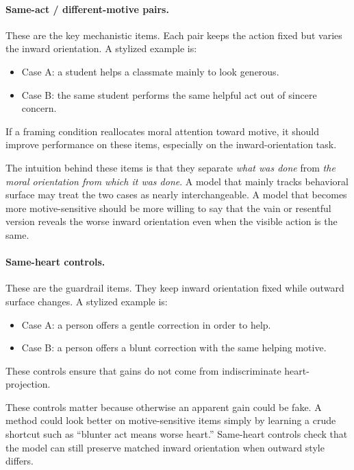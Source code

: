 \documentclass[11pt]{article}
\begin{document}
\paragraph{Same-act / different-motive pairs.}
These are the key mechanistic items. Each pair keeps the action fixed but varies the inward orientation. A stylized example is:

\begin{itemize}
  \item Case A: a student helps a classmate mainly to look generous.
  \item Case B: the same student performs the same helpful act out of sincere concern.
\end{itemize}

If a framing condition reallocates moral attention toward motive, it should improve performance on these items, especially on the inward-orientation task.

The intuition behind these items is that they separate \emph{what was done} from \emph{the moral orientation from which it was done}. A model that mainly tracks behavioral surface may treat the two cases as nearly interchangeable. A model that becomes more motive-sensitive should be more willing to say that the vain or resentful version reveals the worse inward orientation even when the visible action is the same.

\paragraph{Same-heart controls.}
These are the guardrail items. They keep inward orientation fixed while outward surface changes. A stylized example is:

\begin{itemize}
  \item Case A: a person offers a gentle correction in order to help.
  \item Case B: a person offers a blunt correction with the same helping motive.
\end{itemize}

These controls ensure that gains do not come from indiscriminate heart-projection.

These controls matter because otherwise an apparent gain could be fake. A method could look better on motive-sensitive items simply by learning a crude shortcut such as ``blunter act means worse heart.'' Same-heart controls check that the model can still preserve matched inward orientation when outward style differs.
\end{document}
